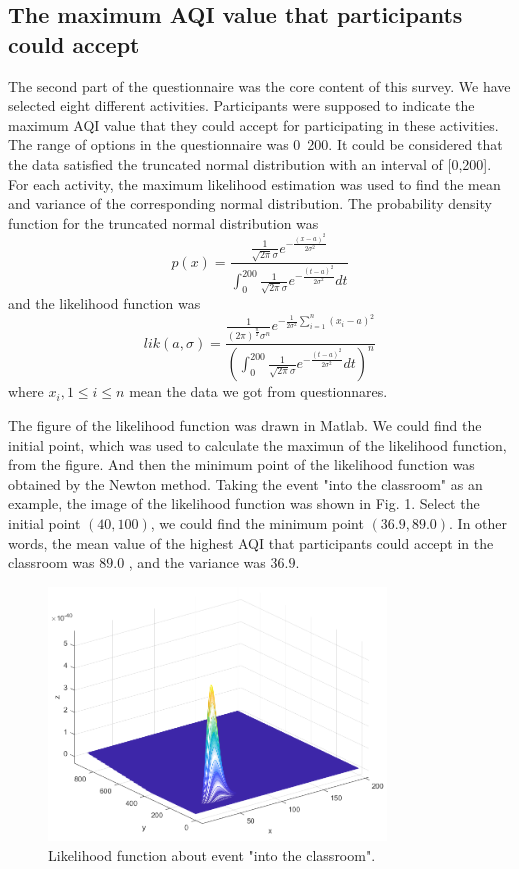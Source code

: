 \subsection{The maximum AQI value that participants could accept}
The second part of the questionnaire was the core content of this survey. We have selected eight different activities. Participants were supposed to indicate the maximum AQI value that they could accept for participating in these activities. The range of options in the questionnaire was 0~200. It could be considered that the data satisfied the truncated normal distribution with an interval of [0,200]. For each activity, the maximum likelihood estimation was used to find the mean and variance of the corresponding normal distribution. The probability density function for the truncated normal distribution was
$$p(x) = \frac{
    \frac{1}{\sqrt{2\pi}\sigma} e^{-\frac{(x-a)^2}{2\sigma^2}}
}{
    \int_0^{200} \frac{1}{\sqrt{2\pi}\sigma} e^{-\frac{(t-a)^2}{2\sigma^2}} dt
}$$
and the likelihood function was
$$lik(a,\sigma) = \frac{
    \frac{1}{(2\pi)^{\frac{n}{2}}\sigma ^n} e^{-\frac{1}{2\sigma^2}\sum_{i=1}^n(x_i-a)^2}
}{
    (\int_0^{200} \frac{1}{\sqrt{2\pi}\sigma} e^{-\frac{(t-a)^2}{2\sigma^2}} dt)^n
}$$
where $x_i, 1\leq i\leq n$ mean the data we got from questionnares.

The figure of the likelihood function was drawn in Matlab. We could find the initial point, which was used to calculate the maximun of the likelihood function, from the figure. And then the minimum point of the likelihood function was obtained by the Newton method. Taking the event "into the classroom" as an example, the image of the likelihood function was shown in Fig. 1. Select the initial point $(40,100)$, we could find the minimum point $(36.9,89.0)$. In other words, the mean value of the highest AQI that participants could accept in the classroom was $89.0$ , and the variance was $36.9$.

\begin{figure}
\centering
\includegraphics[width=0.8\textwidth]{1.png}
\caption{\label{fig:frog}Likelihood function about event "into the classroom".}
\end{figure}

